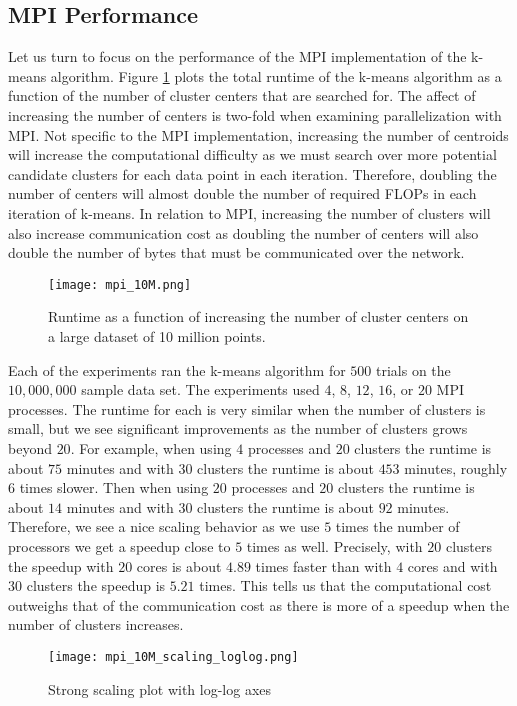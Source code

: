 \documentclass[10pt,twocolumn,letterpaper]{article}
\begin{document}
\subsection{MPI Performance}
Let us turn to focus on the performance of the MPI implementation of the k-means algorithm. Figure \ref{fig:mpi1} plots the total runtime of the k-means algorithm as a function of the number of cluster centers that are searched for. The affect of increasing the number of centers is two-fold when examining parallelization with MPI. Not specific to the MPI implementation, increasing the number of centroids will increase the computational difficulty as we must search over more potential candidate clusters for each data point in each iteration. Therefore, doubling the number of centers will almost double the number of required FLOPs in each iteration of k-means. In relation to MPI, increasing the number of clusters will also increase communication cost as doubling the number of centers will also double the number of bytes that must be communicated over the network. 
\begin{figure}[!t]
\centering
\texttt{[image: mpi\_10M.png]}
\caption{Runtime as a function of increasing the number of cluster centers on a large dataset of 10 million points.}
\label{fig:mpi1}
\end{figure}

Each of the experiments ran the k-means algorithm for $500$ trials on the $10,000,000$ sample data set. The experiments used $4$, $8$, $12$, $16$, or $20$ MPI processes. The runtime for each is very similar when the number of clusters is small, but we see significant improvements as the number of clusters grows beyond $20$. For example, when using $4$ processes and $20$ clusters the runtime is about $75$ minutes and with $30$ clusters the runtime is about $453$ minutes, roughly $6$ times slower. Then when using $20$ processes and $20$ clusters the runtime is about $14$ minutes and with $30$ clusters the runtime is about $92$ minutes. Therefore, we see a nice scaling behavior as we use $5$ times the number of processors we get a speedup close to $5$ times as well. Precisely, with $20$ clusters the speedup with $20$ cores is about $4.89$ times faster than with $4$ cores and with $30$ clusters the speedup is $5.21$ times. This tells us that the computational cost outweighs that of the communication cost as there is more of a speedup when the number of clusters increases.

\begin{figure}[!t]
\centering
\texttt{[image: mpi\_10M\_scaling\_loglog.png]}
\caption{Strong scaling plot with log-log axes}
\label{fig:mpi2}
\end{figure}
\end{document}

